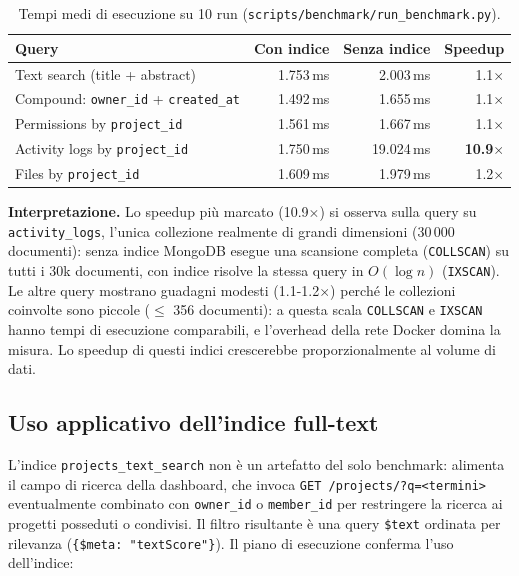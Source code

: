\documentclass[11pt,a4paper]{article}
\begin{document}
\begin{table}[h!]
\centering
\small
\begin{tabular}{@{}p{4.6cm}rrr@{}}
\toprule
\textbf{Query} & \textbf{Con indice} & \textbf{Senza indice} & \textbf{Speedup} \\
\midrule
Text search (title + abstract) & 1.753\,ms & 2.003\,ms & 1.1$\times$ \\
Compound: \texttt{owner\_id} + \texttt{created\_at} & 1.492\,ms & 1.655\,ms & 1.1$\times$ \\
Permissions by \texttt{project\_id} & 1.561\,ms & 1.667\,ms & 1.1$\times$ \\
Activity logs by \texttt{project\_id} & 1.750\,ms & 19.024\,ms & \textbf{10.9$\times$} \\
Files by \texttt{project\_id} & 1.609\,ms & 1.979\,ms & 1.2$\times$ \\
\bottomrule
\end{tabular}
\caption{Tempi medi di esecuzione su 10 run (\texttt{scripts/benchmark/run\_benchmark.py}).}
\label{tab:bench}
\end{table}

\textbf{Interpretazione.} Lo speedup più marcato (10.9$\times$) si osserva sulla query su \texttt{activity\_logs}, l'unica collezione realmente di grandi dimensioni (30\,000 documenti): senza indice MongoDB esegue una scansione completa (\texttt{COLLSCAN}) su tutti i 30k documenti, con indice risolve la stessa query in $O(\log n)$ (\texttt{IXSCAN}). Le altre query mostrano guadagni modesti (1.1-1.2$\times$) perché le collezioni coinvolte sono piccole ($\le$ 356 documenti): a questa scala \texttt{COLLSCAN} e \texttt{IXSCAN} hanno tempi di esecuzione comparabili, e l'overhead della rete Docker domina la misura. Lo speedup di questi indici crescerebbe proporzionalmente al volume di dati.

\subsection{Uso applicativo dell'indice full-text}

L'indice \texttt{projects\_text\_search} non è un artefatto del solo benchmark: alimenta il campo di ricerca della dashboard, che invoca \texttt{GET /projects/?q=<termini>} eventualmente combinato con \texttt{owner\_id} o \texttt{member\_id} per restringere la ricerca ai progetti posseduti o condivisi. Il filtro risultante è una query \texttt{\$text} ordinata per rilevanza (\texttt{\{\$meta: "textScore"\}}). Il piano di esecuzione conferma l'uso dell'indice:
\end{document}
